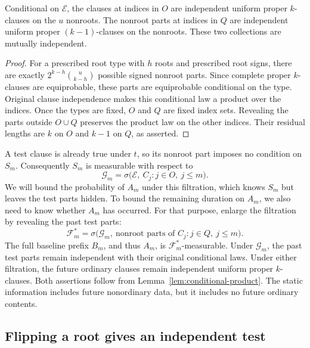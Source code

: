 \begin{lemma}\label{lem:conditional-product}
Conditional on \(\mathcal E\), the clauses at indices in \(O\) are
independent uniform proper \(k\)-clauses on the \(u\) nonroots.
The nonroot parts at indices in \(Q\) are independent uniform proper
\((k-1)\)-clauses on the nonroots.  These two collections are mutually
independent.
\end{lemma}

\begin{proof}
For a prescribed root type with \(h\) roots and prescribed root signs,
there are exactly \(2^{k-h}\binom{u}{k-h}\) possible signed nonroot
parts.  Since complete proper \(k\)-clauses are equiprobable, these
parts are equiprobable conditional on the type.  Original clause
independence makes this conditional law a product over the indices.
Once the types are fixed, \(O\) and \(Q\) are fixed index sets.
Revealing the parts outside \(O\cup Q\) preserves the product law
on the other indices.  Their residual lengths are \(k\) on \(O\)
and \(k-1\) on \(Q\), as asserted.
\end{proof}

A test clause is already true under \(t\), so its nonroot part
imposes no condition on \(S_m\).
Consequently \(S_m\) is measurable with respect to
\[
 \mathcal G_m
 =\sigma\bigl(\mathcal E,\ C_j:j\in O,\ j\le m\bigr).
\]
We will bound the probability of \(A_m\) under this filtration, which
knows \(S_m\) but leaves the test parts hidden.  To bound the remaining
duration on \(A_m\), we also need to know whether \(A_m\) has occurred.
For that purpose, enlarge the filtration by revealing the past test parts:
\[
 \mathcal F_m^*
 =\sigma\bigl(\mathcal G_m,\ 
       \text{nonroot parts of }C_j:j\in Q,\ j\le m\bigr).
\]
The full baseline prefix \(B_m\), and thus \(A_m\), is
\(\mathcal F_m^*\)-measurable.  Under \(\mathcal G_m\), the past
test parts remain independent with their original conditional laws.
Under either filtration, the future ordinary clauses remain independent
uniform proper \(k\)-clauses.  Both assertions follow from
Lemma~\ref{lem:conditional-product}.  The static information includes
future nonordinary data, but it includes no future ordinary contents.

\subsection{Flipping a root gives an independent test}

